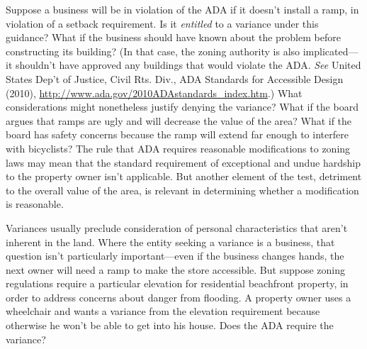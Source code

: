\item Suppose a business will be in violation of the ADA if it doesn't install a
ramp, in violation of a setback requirement. Is it \textit{entitled} to a
variance under this guidance? What if the business should have known about the
problem before constructing its building? (In that case, the zoning authority is
also implicated---it shouldn't have approved any buildings that would violate
the ADA. \textit{See} United States Dep't of Justice, Civil Rts. Div., ADA
Standards for Accessible Design (2010),
\url{http://www.ada.gov/2010ADAstandards_index.htm}.) What considerations might
nonetheless justify denying the variance? What if the board argues that ramps
are ugly and will decrease the value of the area? What if the board has safety
concerns because the ramp will extend far enough to interfere with bicyclists?
The rule that ADA requires reasonable modifications to zoning laws may mean that
the standard requirement of exceptional and undue hardship to the property owner
isn't applicable. But another element of the test, detriment to the overall
value of the area, is relevant in determining whether a modification is
reasonable.

\item Variances usually preclude consideration of personal characteristics that
aren't inherent in the land. Where the entity seeking a variance is a business,
that question isn't particularly important---even if the business changes hands,
the next owner will need a ramp to make the store accessible. But suppose zoning
regulations require a particular elevation for residential beachfront property,
in order to address concerns about danger from flooding. A property owner uses a
wheelchair and wants a variance from the elevation requirement because otherwise
he won't be able to get into his house. Does the ADA require the variance?

